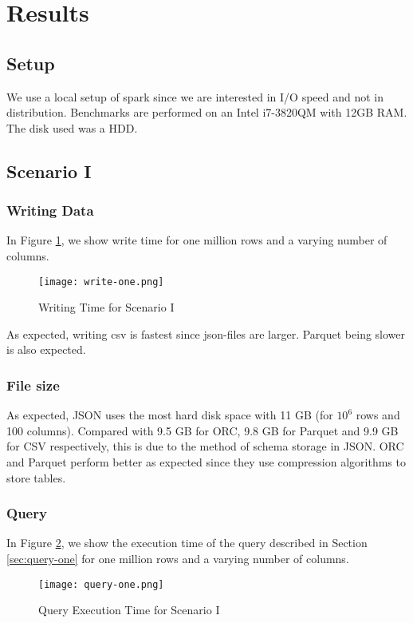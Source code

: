\section{Results} \label{sec:results}


\subsection{Setup}
We use a local setup of spark since we are interested in I/O speed and not in distribution.
Benchmarks are performed on an Intel i7-3820QM with 12GB RAM. The disk used was a HDD.
\subsection{Scenario I}
\subsubsection{Writing Data}
In Figure \ref{fig:write-one}, we show write time for one million rows and a varying number of columns.
\begin{figure}[!htb]
\caption{Writing Time for Scenario I}
\centering
\texttt{[image: write-one.png]}
\label{fig:write-one}
\end{figure}

As expected, writing csv is fastest since json-files are larger. Parquet being slower is also expected.

\subsubsection{File size}
As expected, JSON uses the most hard disk space with 11 GB (for $10^6$ rows and 100 columns).
Compared with 9.5 GB for ORC, 9.8 GB for Parquet and 9.9 GB for CSV respectively, this is due to the method of schema storage in JSON.
ORC and Parquet perform better as expected since they use compression algorithms to store tables.

\subsubsection{Query}
In Figure \ref{fig:query-one}, we show the execution time of the query described in Section \ref{sec:query-one} for one million rows and a varying number of columns.

\begin{figure}[!htb]
\caption{Query Execution Time for Scenario I}
\centering
\texttt{[image: query-one.png]}
\label{fig:query-one}
\end{figure}

